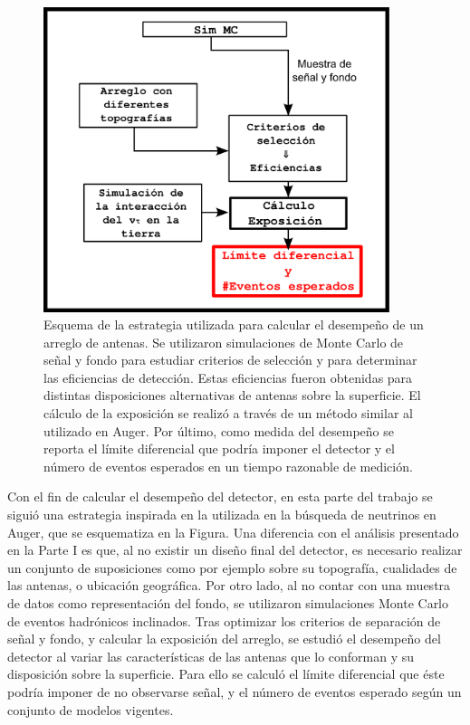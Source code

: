 \begin{figure}[h!]
	\begin{center}
		\includegraphics[width=0.9\textwidth]{fig/motivacionRadio/analysisSchemaRadio_v2}
		\caption*{Esquema de la estrategia utilizada para calcular el desempe\~no de un arreglo de antenas. Se utilizaron simulaciones de Monte Carlo de se\~nal y fondo para estudiar criterios de selecci\'on y para determinar las eficiencias de detecci\'on. Estas eficiencias fueron obtenidas para distintas disposiciones alternativas de antenas sobre la superficie. El c\'alculo de la exposici\'on se realiz\'o a trav\'es de un m\'etodo similar al utilizado en Auger. Por \'ultimo, como medida del desempe\~no se reporta el l\'imite diferencial que podr\'ia imponer el detector y el n\'umero de eventos esperados en un tiempo razonable de medici\'on.}
		\label{fig:analysisSchemaRadio}
	\end{center}
\end{figure}
%
Con el fin de calcular el desempe\~no del detector, en esta parte del trabajo se sigui\'o una estrategia inspirada en la utilizada en la b\'usqueda de neutrinos en Auger, que se esquematiza en la Figura.
Una diferencia con el an\'alisis presentado en la Parte I es que, al no existir un dise\~no final del detector, es necesario realizar un conjunto de suposiciones como por ejemplo sobre  su topograf\'ia, cualidades de las antenas, o ubicaci\'on geogr\'afica.
Por otro lado, al no contar con una muestra de datos como representaci\'on del fondo, se utilizaron simulaciones Monte Carlo de eventos hadr\'onicos inclinados.
Tras optimizar los criterios de separaci\'on de se\~nal y fondo, y calcular la exposici\'on del arreglo, se estudi\'o el desempe\~no del detector al variar las caracter\'isticas de las antenas que lo conforman y su disposici\'on sobre la superficie.
Para ello se calcul\'o el l\'imite diferencial que \'este podr\'ia imponer de no observarse se\~nal, y el n\'umero de eventos esperado seg\'un un conjunto de modelos vigentes.

